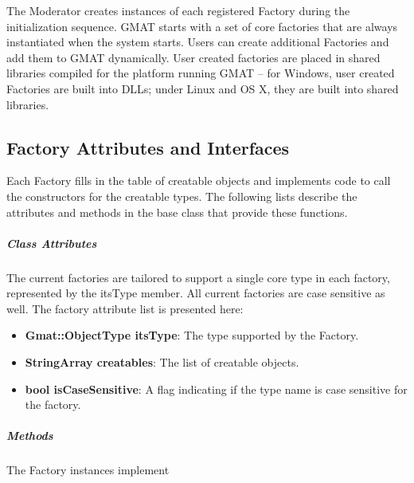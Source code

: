 The Moderator creates instances of each registered Factory during the initialization sequence.  GMAT
starts with a set of core factories that are always instantiated when the system starts.  Users can
create additional Factories and add them to GMAT dynamically.  User created factories are placed in
shared libraries compiled for the platform running GMAT -- for Windows, user created
Factories are built into DLLs; under Linux and OS X, they are built into shared libraries.

\subsection{Factory Attributes and Interfaces}

Each Factory fills in the table of creatable objects and implements code to call the constructors
for the creatable types.  The following lists describe the attributes and methods in the base class
that provide these functions.

\subparagraph{\textit{Class Attributes}}

The current factories are tailored to support a single core type in each factory, represented by
the itsType member.  All current factories are case sensitive as well.  The factory attribute list
is presented here:

\begin{itemize}
\item \textbf{Gmat::ObjectType itsType}: The type supported by the Factory.
\item \textbf{StringArray creatables}: The list of creatable objects.
\item \textbf{bool isCaseSensitive}: A flag indicating if the type name is case sensitive for the
factory.
\end{itemize}

\subparagraph{\textit{Methods}}

The Factory instances implement


